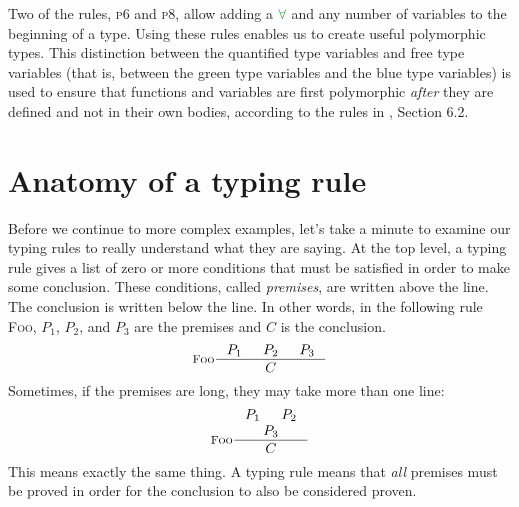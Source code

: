 \documentclass[a4paper]{article}
\newcommand{\RULE}[1]{\textsc{#1}}
\newcommand{\scheme}[1]{\ensuremath{\textcolor{ForestGreen}{#1}}}
\begin{document}
Two of the rules, \RULE{p6} and \RULE{p8}, allow adding a $\scheme\forall$ and
any number of variables to the beginning of a type. Using these rules enables
us to create useful polymorphic types.  This distinction between the
quantified type variables and free type variables (that is, between the green
type variables and the blue type variables) is used to ensure that functions
and variables are first polymorphic \emph{after} they are defined and not in
their own bodies, according to the rules in \citet{Sestoft2012}, Section 6.2.

\section{Anatomy of a typing rule}
\label{sec:anatomy-typing-rule}

Before we continue to more complex examples, let's take a minute to examine
our typing rules to really understand what they are saying. At the top level,
a typing rule gives a list of zero or more conditions that must be satisfied
in order to make some conclusion. These conditions, called \emph{premises},
are written above the line. The conclusion is written below the line. In other
words, in the following rule \RULE{Foo}, $P_1$, $P_2$, and $P_3$ are the
premises and $C$ is the conclusion.
\begin{displaymath}
  \inference[\RULE{Foo}]{P_1 & P_2 & P_3}{C}
\end{displaymath}
Sometimes, if the premises are long, they may take more than one line:
\begin{displaymath}
  \inference[\RULE{Foo}]{P_1 & P_2 \\ P_3}{C}
\end{displaymath}
This means exactly the same thing. A typing rule means that \emph{all}
premises must be proved in order for the conclusion to also be considered
proven.
\end{document}
